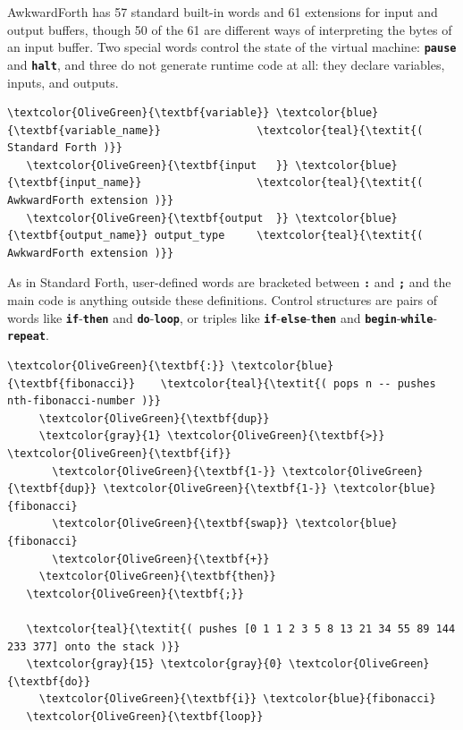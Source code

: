 \documentclass{webofc}
\begin{document}
AwkwardForth has 57 standard built-in words and 61 extensions for input and output buffers, though 50 of the 61 are different ways of interpreting the bytes of an input buffer. Two special words control the state of the virtual machine: \textcolor{OliveGreen}{\tt\textbf{pause}} and \textcolor{OliveGreen}{\tt\textbf{halt}}, and three do not generate runtime code at all: they declare variables, inputs, and outputs.

\small
\begin{Verbatim}[commandchars=\\\{\}]
   \textcolor{OliveGreen}{\textbf{variable}} \textcolor{blue}{\textbf{variable_name}}               \textcolor{teal}{\textit{( Standard Forth )}}
   \textcolor{OliveGreen}{\textbf{input   }} \textcolor{blue}{\textbf{input_name}}                  \textcolor{teal}{\textit{( AwkwardForth extension )}}
   \textcolor{OliveGreen}{\textbf{output  }} \textcolor{blue}{\textbf{output_name}} output_type     \textcolor{teal}{\textit{( AwkwardForth extension )}}
\end{Verbatim}
\normalsize

As in Standard Forth, user-defined words are bracketed between \textcolor{OliveGreen}{\tt\textbf{:}} and \textcolor{OliveGreen}{\tt\textbf{;}} and the main code is anything outside these definitions. Control structures are pairs of words like \textcolor{OliveGreen}{\tt\textbf{if}}-\textcolor{OliveGreen}{\tt\textbf{then}} and \textcolor{OliveGreen}{\tt\textbf{do}}-\textcolor{OliveGreen}{\tt\textbf{loop}}, or triples like \textcolor{OliveGreen}{\tt\textbf{if}}-\textcolor{OliveGreen}{\tt\textbf{else}}-\textcolor{OliveGreen}{\tt\textbf{then}} and \textcolor{OliveGreen}{\tt\textbf{begin}}-\textcolor{OliveGreen}{\tt\textbf{while}}-\textcolor{OliveGreen}{\tt\textbf{repeat}}.

\small
\begin{Verbatim}[commandchars=\\\{\}]
   \textcolor{OliveGreen}{\textbf{:}} \textcolor{blue}{\textbf{fibonacci}}    \textcolor{teal}{\textit{( pops n -- pushes nth-fibonacci-number )}}
     \textcolor{OliveGreen}{\textbf{dup}}
     \textcolor{gray}{1} \textcolor{OliveGreen}{\textbf{>}} \textcolor{OliveGreen}{\textbf{if}}
       \textcolor{OliveGreen}{\textbf{1-}} \textcolor{OliveGreen}{\textbf{dup}} \textcolor{OliveGreen}{\textbf{1-}} \textcolor{blue}{fibonacci}
       \textcolor{OliveGreen}{\textbf{swap}} \textcolor{blue}{fibonacci}
       \textcolor{OliveGreen}{\textbf{+}}
     \textcolor{OliveGreen}{\textbf{then}}
   \textcolor{OliveGreen}{\textbf{;}}

   \textcolor{teal}{\textit{( pushes [0 1 1 2 3 5 8 13 21 34 55 89 144 233 377] onto the stack )}}
   \textcolor{gray}{15} \textcolor{gray}{0} \textcolor{OliveGreen}{\textbf{do}}
     \textcolor{OliveGreen}{\textbf{i}} \textcolor{blue}{fibonacci}
   \textcolor{OliveGreen}{\textbf{loop}}
\end{Verbatim}
\normalsize
\end{document}
